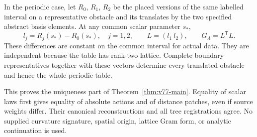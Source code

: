 In the periodic case, let $R_0$, $R_1$, $R_2$ be the placed versions
of the same labelled interval on a representative obstacle and its
translates by the two specified abstract basis elements.  At any common
scalar parameter $s_*$,
\begin{equation}\label{eq:v77-lattice}
 l_j=R_j(s_*)-R_0(s_*),\quad j=1,2,\qquad
 L=(l_1\ l_2),\qquad G_\Lambda=L^\mathsf TL.
\end{equation}
These differences are constant on the common interval for actual data.
They are independent because the table has rank-two lattice.  Complete
boundary representatives together with these vectors determine every
translated obstacle and hence the whole periodic table.

This proves the uniqueness part of Theorem~\ref{thm:v77-main}.
Equality of scalar laws first gives equality of absolute actions and
of distance patches, even if source weights differ.  Their canonical
reconstructions and all tree registrations agree.  No supplied
curvature signature, spatial origin, lattice Gram form, or analytic
continuation is used.
